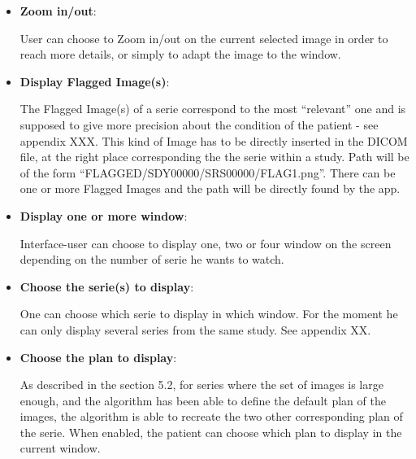 \begin{itemize}
	\item {\IconZoom} \textbf{Zoom in/out}:
	
	\newline \vspace{3mm} 
	
	User can choose to Zoom in/out on the current selected image in order to reach more details, or simply to adapt the image to the window.
	
	\item {\IconFlag} \textbf{Display Flagged Image(s)}: 
	
	\newline \vspace{3mm} 
	
	The Flagged Image(s) of a serie correspond to the most ``relevant'' one and is supposed to give more precision about the condition of the patient - see appendix XXX. This kind of Image has to be directly inserted in the DICOM file, at the right place corresponding the the serie within a study. Path will be of the form ``FLAGGED/SDY00000/SRS00000/FLAG1.png''. There can be one or more Flagged Images and the path will be directly found by the app.
	\item {\IconFourWindow} \textbf{Display one or more window}:
	
	\newline \vspace{3mm} 
	
	Interface-user can choose to display one, two or four window on the screen depending on the number of serie he wants to watch.
	
	\item {\IconOneWindow} \textbf{Choose the serie(s) to display}:
	
	\newline \vspace{3mm}
	
	One can choose which serie to display in which window. For the moment he can only display several series from the same study. See appendix XX.
	
	\item {\IconPlan} \textbf{Choose the plan to display}:
	
	\newline \vspace{3mm}
	
	As described in the section 5.2, for series where the set of images is large enough, and the algorithm has been able to define the default plan of the images, the algorithm is able to recreate the two other corresponding plan of the serie. When enabled, the patient can choose which plan to display in the current window.
	

\end{itemize}
